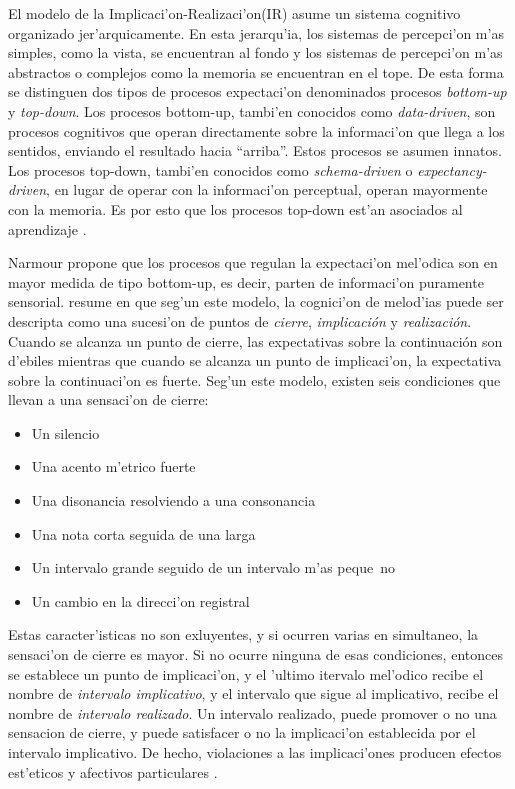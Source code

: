 \begin{imagen}
    \width{11cm}
\end{imagen}


El modelo de la Implicaci'on-Realizaci'on(IR) asume un sistema cognitivo organizado jer'arquicamente. En esta jerarqu'ia, los sistemas 
de percepci'on m'as simples, como la vista, se encuentran al fondo y los sistemas de percepci'on m'as abstractos o complejos como la memoria
se encuentran en el tope. De esta forma se distinguen dos tipos de procesos expectaci'on denominados procesos \emph{bottom-up} 
y \emph{top-down}. Los procesos bottom-up, tambi'en conocidos como \emph{data-driven}, son procesos cognitivos que operan directamente sobre la informaci'on que llega
a los sentidos, enviando el resultado hacia ``arriba''. Estos procesos se asumen innatos.  Los procesos top-down, tambi'en conocidos como \emph{schema-driven} o 
\emph{expectancy-driven}, en lugar de operar con la informaci'on perceptual, operan mayormente con la memoria. Es por esto que los procesos top-down est'an asociados al aprendizaje \cite[p. 256, p. 264]{snyder2001}.

Narmour propone que los procesos que regulan la expectaci'on mel'odica son en mayor medida de tipo bottom-up, es decir, parten de informaci'on puramente sensorial. 
\cite{Krumhansl95} resume en  que seg'un este modelo, la cognici'on de melod'ias puede ser descripta como una sucesi'on de puntos 
de \emph{cierre}, \emph{implicaci\'on} y \emph{realizaci\'on}. Cuando se alcanza un punto de cierre, las expectativas sobre la continuaci\'on 
son d'ebiles mientras que cuando se alcanza un punto de implicaci'on, la expectativa sobre la continuaci'on es fuerte. Seg'un este modelo,
existen seis condiciones que llevan a una sensaci'on de cierre:
\begin{itemize}
 \item Un silencio
 \item Una acento m'etrico fuerte
 \item Una disonancia resolviendo a una consonancia
 \item Una nota corta seguida de una larga
 \item Un intervalo grande seguido de un intervalo m'as peque~no
 \item Un cambio en la direcci'on registral
\end{itemize}

Estas caracter'isticas no son exluyentes, y si ocurren varias en simultaneo, la sensaci'on de cierre es mayor. 
Si no ocurre ninguna de esas condiciones, entonces se establece un punto de implicaci'on, y el 'ultimo itervalo mel'odico recibe el nombre
de \emph{intervalo implicativo}, y el intervalo que sigue al implicativo, recibe el nombre de \emph{intervalo realizado}. 
Un intervalo realizado, puede promover o no una sensacion de cierre, y puede satisfacer o no la implicaci'on establecida por el intervalo 
implicativo. De hecho, violaciones a las implicaci'ones producen efectos est'eticos y afectivos particulares \citep{Narmour91}.
 
